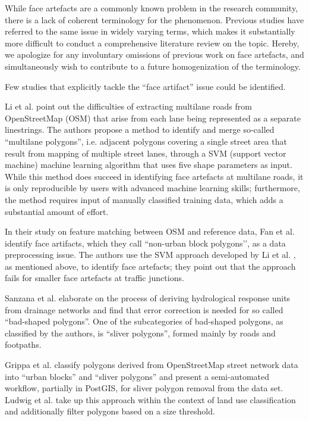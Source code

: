 While face artefacts are a commonly known problem in the research community, there is a
lack of coherent terminology for the phenomenon. Previous studies have referred to the
same issue in widely varying terms, which makes it substantially more difficult to
conduct a comprehensive literature review on the topic. Hereby, we apologize for any
involuntary omissions of previous work on face artefacts, and simultaneously wish to
contribute to a future homogenization of the terminology.

Few studies that explicitly tackle the ``face artifact'' issue could be identified.

Li et al. \cite{li_polygon-based_2014} point out the difficulties of extracting
multilane roads from OpenStreetMap (OSM) that arise from each lane being represented as
a separate linestrings. The authors propose a method to identify and merge so-called
``multilane polygons'', i.e. adjacent polygons covering a single street area that result
from mapping of multiple street lanes, through a SVM (support vector machine) machine
learning algorithm that uses five shape parameters as input. While this method does
succeed in identifying face artefacts at multilane roads, it is only reproducible by
users with advanced machine learning skills; furthermore, the method requires input of
manually classified training data, which adds a substantial amount of effort.

In their study on feature matching between OSM and reference data, Fan et al.
\cite{fan_polygon-based_2016} identify face artifacts, which they call ``non-urban block
polygons’’, as a data preprocessing issue. The authors use the SVM approach developed by
Li et al. \cite{li_polygon-based_2014}, as mentioned above, to identify face artefacts;
they point out that the approach fails for smaller face artefacts at traffic junctions.

Sanzana et al. \cite{sanzana_decomposition_2018} elaborate on the process of deriving
hydrological response units from drainage networks and find that error correction is
needed for so called ``bad-shaped polygons''. One of the subcategories of bad-shaped
polygons, as classified by the authors, is ``sliver polygons'', formed mainly by roads
and footpaths.

Grippa et al. \cite{grippa_mapping_2018} classify polygons derived from OpenStreetMap
street network data into ``urban blocks'' and ``sliver polygons'' and present a
semi-automated workflow, partially in PostGIS, for sliver polygon removal from the data
set. Ludwig et al. \cite{ludwig_mapping_2021} take up this approach within the context
of land use classification and additionally filter polygons based on a size threshold.

